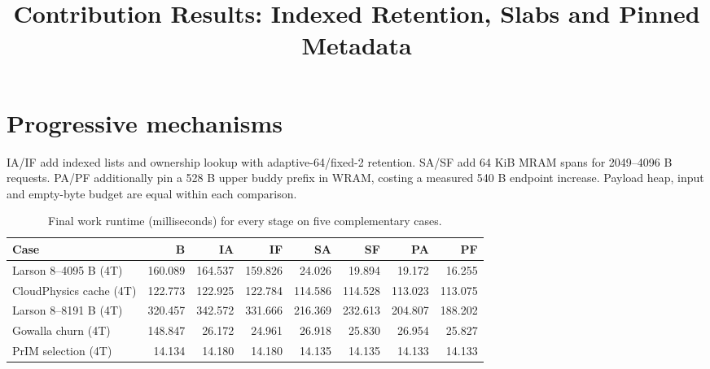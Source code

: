 \documentclass[conference,onecolumn]{IEEEtran}
\title{Contribution Results: Indexed Retention, Slabs and Pinned Metadata}
\author{\IEEEauthorblockN{CS5290 Project Group}}
\begin{document}
\maketitle
\section{Progressive mechanisms}
IA/IF add indexed lists and ownership lookup with adaptive-64/fixed-2 retention. SA/SF add 64 KiB MRAM spans for 2049--4096 B requests. PA/PF additionally pin a 528 B upper buddy prefix in WRAM, costing a measured 540 B endpoint increase. Payload heap, input and empty-byte budget are equal within each comparison.
\begin{table}[!htbp]
\caption{Final work runtime (milliseconds) for every stage on five complementary cases.}\label{tab:final-main}
\centering\small
\begin{tabular}{lrrrrrrr}\toprule
Case & B & IA & IF & SA & SF & PA & PF \\ \midrule
Larson 8--4095 B (4T) & 160.089 & 164.537 & 159.826 & 24.026 & 19.894 & 19.172 & 16.255 \\
CloudPhysics cache (4T) & 122.773 & 122.925 & 122.784 & 114.586 & 114.528 & 113.023 & 113.075 \\
Larson 8--8191 B (4T) & 320.457 & 342.572 & 331.666 & 216.369 & 232.613 & 204.807 & 188.202 \\
Gowalla churn (4T) & 148.847 & 26.172 & 24.961 & 26.918 & 25.830 & 26.954 & 25.827 \\
PrIM selection (4T) & 14.134 & 14.180 & 14.180 & 14.135 & 14.135 & 14.133 & 14.133 \\
\bottomrule\end{tabular}
\par\vspace{2pt}{\footnotesize B: scan fixed-2; I: indexed; S: indexed plus 64 KiB slabs; P: indexed plus slabs plus pinned metadata. A uses adaptive interval 64; F retains at most two empty spans/class. All rows use four tasklets.}
\end{table}
\end{document}
